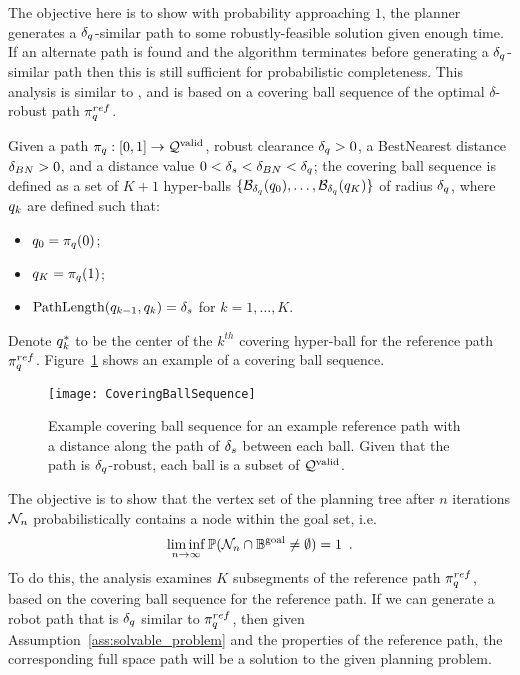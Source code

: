 The objective here is to show with probability approaching $1$, the planner generates a $\delta_q$-similar path to some robustly-feasible solution given enough time.  If an alternate path is found and the algorithm terminates before generating a $\delta_q$-similar path then this is still sufficient for probabilistic completeness.  This analysis is similar to \cite{LiAOKP2016}, and is based on a covering ball sequence of the optimal  $\delta$-robust path $\pi_{q}^{ref}$.

\begin{definition}
    \label{def:coveringballseq}
    Given a path $\pi_{q} : [0, 1] \rightarrow \mathcal{Q}^{\textrm{valid}}$, robust clearance $\delta_q > 0$, a BestNearest distance $\delta_{BN} > 0$, and a distance value $0 < \delta_s < \delta_{BN} < \delta_q$; the covering ball sequence is defined as a set of $K + 1$ hyper-balls $\{ \mathcal{B}_{\delta_q}(q_0), \dots, \mathcal{B}_{\delta_q}(q_K) \}$ of radius $\delta_q$, where $q_k$ are defined such that:
    \begin{itemize}
        \item $q_0 = \pi_{q}(0)$;
        \item $q_K = \pi_{q}(1)$;
        \item $\textup{PathLength}(q_{k-1}, q_k) = \delta_s$ for $k = 1, \dots, K$.
    \end{itemize}
\end{definition}
\noindent
Denote $q^*_k$ to be the center of the $k^{th}$ covering hyper-ball for the reference path $\pi_{q}^{ref}$. Figure~\ref{fig:covering_ball_sequence} shows an example of a covering ball sequence.

\begin{figure}[h]
    \centering
    \texttt{[image: CoveringBallSequence]}
    \caption{Example covering ball sequence for an example reference path with a distance along the path of $\delta_s$ between each ball. Given that the path is $\delta_q$-robust, each ball is a subset of $\mathcal{Q}^{\textrm{valid}}$. }
    \label{fig:covering_ball_sequence}
\end{figure}

The objective is to show that the vertex set of the planning tree after $n$ iterations $\mathcal{N}_n$ probabilistically contains a node within the goal set, i.e.
\begin{equation}
    \liminf_{n \rightarrow \infty} \mathbb{P}( \mathcal{N}_n \cap \mathbb{B}^\textrm{goal} \neq \emptyset ) = 1 \enspace .
\end{equation}
To do this, the analysis examines $K$ subsegments of the reference path $\pi_{q}^{ref}$, based on the covering ball sequence for the reference path. If we can generate a robot path that is $\delta_q$ similar to $\pi_{q}^{ref}$, then given Assumption~\ref{ass:solvable_problem} and the properties of the reference path, the corresponding full space path will be a solution to the given planning problem.

